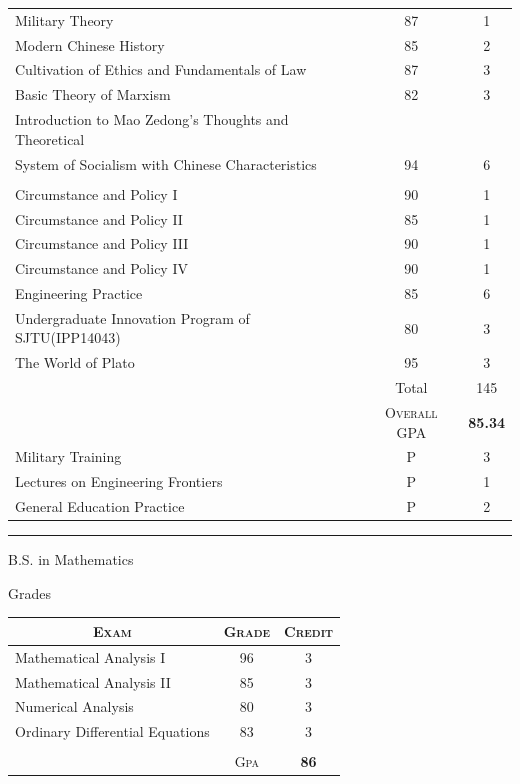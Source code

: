 \documentclass[a4paper,10pt]{article}
\begin{document}
\begin{center}
\begin{tabular}{lcc}
Military Theory         &87&    1\\
Modern Chinese History  &85&    2\\
Cultivation of Ethics and Fundamentals of Law   &87&    3\\
Basic Theory of Marxism     &82&    3\\
Introduction to Mao Zedong's Thoughts and Theoretical  & &\\
\quad System of Socialism with Chinese Characteristics    &94&    6\\\\

Circumstance and Policy I   &90&     1\\
Circumstance and Policy II  &85&    1\\
Circumstance and Policy III &90&     1\\
Circumstance and Policy IV  &90&     1\\
Engineering Practice        &85&    6\\
Undergraduate Innovation Program of SJTU(IPP14043)  &80&    3\\
The World of Plato  &95&    3\\

		& Total&145\\\cline{2-3}
&\textsc{Overall GPA}&\textbf{85.34}\\
Military Training       &P& 3\\
Lectures on Engineering Frontiers   &P& 1\\
General Education Practice  &P&     2\\
\end{tabular}
\end{center}


\bigskip
\hrule
\bigskip
\par{\centering\Large \hypertarget{grds_usc}{B.S. in Mathematics}\par}\large{\centering Grades\par}\normalsize

\begin{center}
\begin{tabular}{lcc}
\multicolumn{1}{c}{\textsc{Exam}}&\textsc{Grade}&\textsc{Credit}\\ \hline
Mathematical Analysis I &96&    3\\
Mathematical Analysis II &85&   3\\
Numerical Analysis      &80&    3\\
Ordinary Differential Equations &83&    3\\

& &\\\cline{2-3}
 &\textsc{Gpa}&\textbf{86}
\end{tabular}
\end{center}

\end{document}
